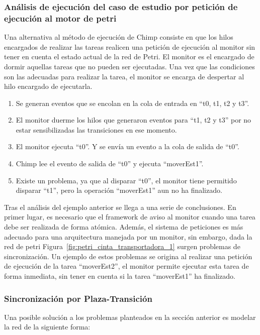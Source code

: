 \subsubsection{Análisis de ejecución del caso de estudio por
petición de ejecución al motor de petri} 
Una alternativa al método de ejecución de Chimp consiste en que los hilos
encargados de realizar las tareas realicen una petición de ejecución al monitor
sin tener en cuenta el estado actual de la red de Petri.
 El monitor es el encargado de dormir aquellas tareas que no pueden ser
 ejecutadas. Una vez que las condiciones son las adecuadas para realizar la
 tarea, el monitor se encarga de despertar al hilo encargado de ejecutarla.
\begin{enumerate}
    \item Se generan eventos que se encolan en la cola de entrada en “t0, t1,
    	t2 y t3”.
    \item El monitor duerme los hilos que generaron eventos para “t1, t2 y t3”
    	por no estar sensibilizadas las transiciones en ese momento.
    \item El monitor ejecuta “t0”. Y se envía un evento a la cola de salida de
    	“t0”.
    \item Chimp lee el evento de salida de “t0” y ejecuta “moverEst1”.
    \item Existe un problema, ya que al disparar “t0”, el monitor tiene
    	permitido disparar “t1”, pero la operación “moverEst1” aun no ha
    	finalizado.
\end{enumerate}
Tras el análisis  del ejemplo anterior se llega a una serie de
conclusiones. En primer lugar, es necesario que el framework de aviso al monitor
cuando una tarea debe ser realizada de forma atómica. Además, el
sistema de peticiones es más adecuado para una arquitectura manejada por un
monitor, sin embargo, dada la red de petri
Figura~\ref{fig:petri_cinta_transportadora_1} surgen problemas de
sincronización. Un ejemplo de estos problemas se origina al realizar una
petición de ejecución de la tarea “moverEst2”, el monitor permite ejecutar esta
tarea de forma inmediata, sin tener en cuenta si la tarea ``moverEst1'' ha
finalizado.

\subsubsection{Sincronización por Plaza-Transición}
Una posible solución a los problemas planteados en la sección anterior es
modelar la red de la siguiente forma:\\

